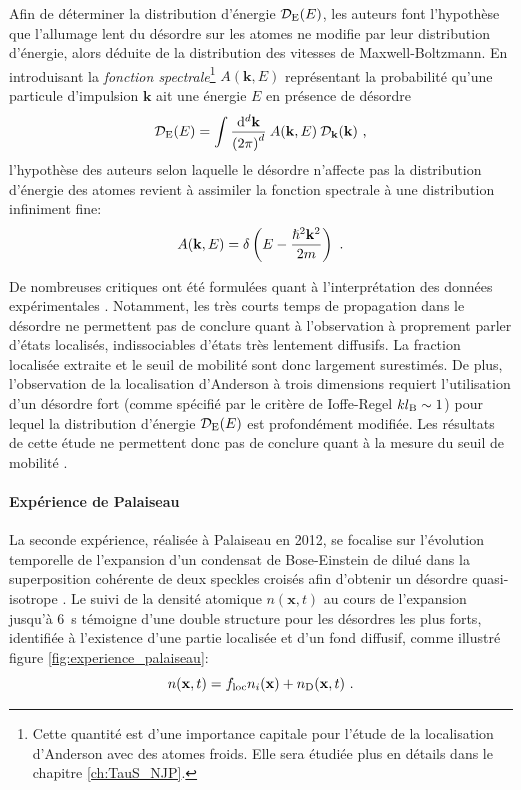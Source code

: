 Afin de déterminer la distribution d'énergie $\mathcal{D}_{\mathrm{E}}(E)$, les auteurs font l'hypothèse que l'allumage lent du désordre sur les atomes ne modifie par leur distribution d'énergie, alors déduite de la distribution des vitesses de Maxwell-Boltzmann. En introduisant la \emph{fonction spectrale}\footnote{Cette quantité est d'une importance capitale pour l'étude de la localisation d'Anderson avec des atomes froids. Elle sera étudiée plus en détails dans le chapitre \ref{ch:TauS_NJP}.} $A(\mathbf{k},E)$ représentant la probabilité qu'une particule d'impulsion $\mathbf{k}$ ait une énergie $E$ en présence de désordre
\begin{equation}
\mathcal{D}_{\mathrm{E}}(E)= \int{\frac{\mathrm{d}^d \mathbf{k}}{{(2 \pi)}^d} \: A(\mathbf{k},E) \: \mathcal{D}_{\mathbf{k}}(\mathbf{k})} \text{ ,}
\label{eq:fonction_spectrale}
\end{equation}
l'hypothèse des auteurs selon laquelle le désordre n'affecte pas la distribution d'énergie des atomes revient à assimiler la fonction spectrale à une distribution infiniment fine:
\begin{equation}
A(\mathbf{k},E) = \delta\left(E- \frac{\hslash^2 \mathbf{k}^2}{2m}\right) \text{ .}
\label{eq:hypothese_urbana_champaign}
\end{equation}

De nombreuses critiques ont été formulées quant à l'interprétation des données expérimentales \citep{muller2014comment}. Notamment, les très courts temps de propagation dans le désordre ne permettent pas de conclure quant à l'observation à proprement parler d'états localisés, indissociables d'états très lentement diffusifs. La fraction localisée extraite et le seuil de mobilité sont donc largement surestimés. De plus, l'observation de la localisation d'Anderson à trois dimensions requiert l'utilisation d'un désordre fort (comme spécifié par le critère de Ioffe-Regel $kl_{\mathrm{B}}\sim 1$) pour lequel la distribution d'énergie $\mathcal{D}_{\mathrm{E}}(E)$ est profondément modifiée. Les résultats de cette étude ne permettent donc pas de conclure quant à la mesure du seuil de mobilité \citep{pasek2017anderson}.



\paragraph*{Expérience de Palaiseau}
La seconde expérience, réalisée à Palaiseau en 2012, se focalise sur l'évolution temporelle de l'expansion d'un condensat de Bose-Einstein de  dilué dans la superposition cohérente de deux speckles croisés afin d'obtenir un désordre quasi-isotrope \citep{jendrzejewski2012three}. Le suivi de la densité atomique $n(\mathbf{x},t)$ au cours de l'expansion jusqu'à \SI{6}{\second} témoigne d'une double structure pour les désordres les plus forts, identifiée à l'existence d'une partie localisée et d'un fond diffusif, comme illustré figure \ref{fig:experience_palaiseau}:
\begin{equation}
n(\mathbf{x},t)= f_{\mathrm{loc}} n_i(\mathbf{x}) + n_{\mathrm{D}}(\mathbf{x},t) \text{ .}
\end{equation}

